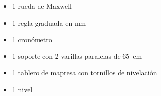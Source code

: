 \documentclass[../main]{subfiles}
\begin{document}
\begin{itemize}
  \item 1 rueda de Maxwell
  \item 1 regla graduada en \unit{\mm}
  \item 1 cronómetro
  \item 1 soporte con 2 varillas paralelas de \qty{65}{\cm}
  \item 1 tablero de mapresa con tornillos de nivelación
  \item 1 nivel
\end{itemize}
\end{document}
